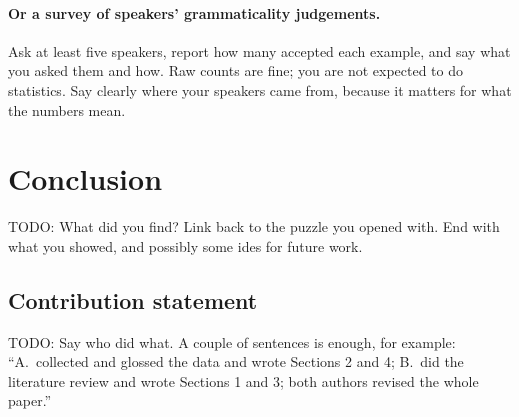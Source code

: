 \documentclass[a4paper,12pt]{article}
\begin{document}
\paragraph{Or a survey of speakers' grammaticality judgements.}
Ask at least five speakers, report how many accepted each example, and
say what you asked them and how.  Raw counts are fine; you are not
expected to do statistics.  Say clearly where your speakers came from,
because it matters for what the numbers mean.

\section{Conclusion}

TODO: What did you find?  Link back to the puzzle you opened with.
End with what you showed, and possibly some ides for future work.

\subsection*{Contribution statement}

TODO: Say who did what.  A couple of sentences is enough, for example:
``A.\ collected and glossed the data and wrote Sections 2 and 4;
B.\ did the literature review and wrote Sections 1 and 3; both authors
revised the whole paper.''



\end{document}
